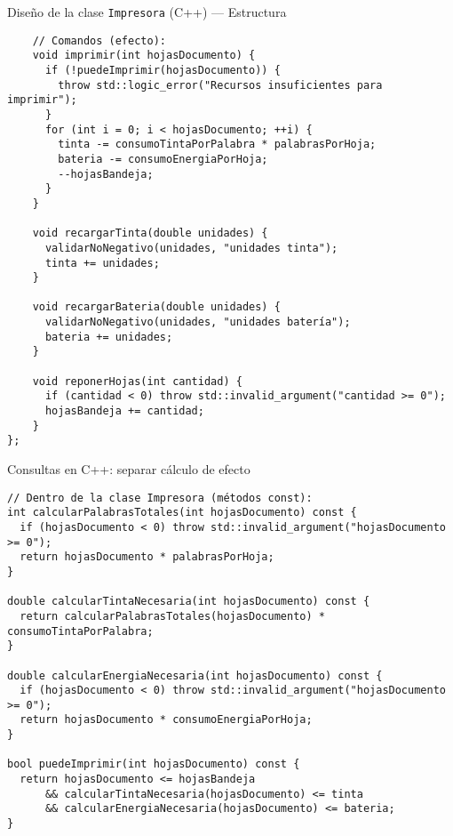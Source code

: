 \documentclass[aspectratio=169]{beamer}
\begin{document}
\begin{frame}[fragile]{Diseño de la clase \texttt{Impresora} (C++) — Estructura}
\begin{lstlisting}
    // Comandos (efecto):
    void imprimir(int hojasDocumento) {
      if (!puedeImprimir(hojasDocumento)) {
        throw std::logic_error("Recursos insuficientes para imprimir");
      }
      for (int i = 0; i < hojasDocumento; ++i) {
        tinta -= consumoTintaPorPalabra * palabrasPorHoja;
        bateria -= consumoEnergiaPorHoja;
        --hojasBandeja;
      }
    }

    void recargarTinta(double unidades) {
      validarNoNegativo(unidades, "unidades tinta");
      tinta += unidades;
    }

    void recargarBateria(double unidades) {
      validarNoNegativo(unidades, "unidades batería");
      bateria += unidades;
    }

    void reponerHojas(int cantidad) {
      if (cantidad < 0) throw std::invalid_argument("cantidad >= 0");
      hojasBandeja += cantidad;
    }
};
\end{lstlisting}
\end{frame}

\begin{frame}[fragile]{Consultas en C++: separar cálculo de efecto}
\lstset{style=cppstyle}
\begin{lstlisting}
// Dentro de la clase Impresora (métodos const):
int calcularPalabrasTotales(int hojasDocumento) const {
  if (hojasDocumento < 0) throw std::invalid_argument("hojasDocumento >= 0");
  return hojasDocumento * palabrasPorHoja;
}

double calcularTintaNecesaria(int hojasDocumento) const {
  return calcularPalabrasTotales(hojasDocumento) * consumoTintaPorPalabra;
}

double calcularEnergiaNecesaria(int hojasDocumento) const {
  if (hojasDocumento < 0) throw std::invalid_argument("hojasDocumento >= 0");
  return hojasDocumento * consumoEnergiaPorHoja;
}

bool puedeImprimir(int hojasDocumento) const {
  return hojasDocumento <= hojasBandeja
      && calcularTintaNecesaria(hojasDocumento) <= tinta
      && calcularEnergiaNecesaria(hojasDocumento) <= bateria;
}
\end{lstlisting}
\end{frame}
\end{document}
